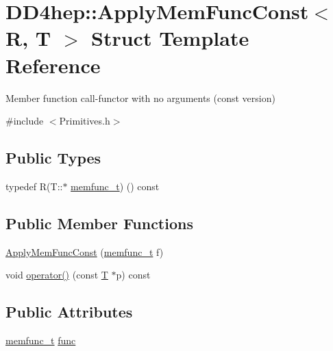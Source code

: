 \hypertarget{struct_d_d4hep_1_1_apply_mem_func_const}{}\section{D\+D4hep\+:\+:Apply\+Mem\+Func\+Const$<$ R, T $>$ Struct Template Reference}
\label{struct_d_d4hep_1_1_apply_mem_func_const}


Member function call-\/functor with no arguments (const version)  




{\ttfamily \#include $<$Primitives.\+h$>$}

\subsection*{Public Types}
\begin{DoxyCompactItemize}
\item 
typedef R(T\+::$\ast$ \hyperlink{struct_d_d4hep_1_1_apply_mem_func_const_a0baa998fbf89b0c25d9de76bbd9a95e7}{memfunc\+\_\+t}) () const
\end{DoxyCompactItemize}
\subsection*{Public Member Functions}
\begin{DoxyCompactItemize}
\item 
\hyperlink{struct_d_d4hep_1_1_apply_mem_func_const_a2ced0eb9c81ba9bb827054c2afc42961}{Apply\+Mem\+Func\+Const} (\hyperlink{struct_d_d4hep_1_1_apply_mem_func_const_a0baa998fbf89b0c25d9de76bbd9a95e7}{memfunc\+\_\+t} f)
\item 
void \hyperlink{struct_d_d4hep_1_1_apply_mem_func_const_a9c658da0085c5cc83f4899e0d5518cf5}{operator()} (const \hyperlink{class_t}{T} $\ast$p) const
\end{DoxyCompactItemize}
\subsection*{Public Attributes}
\begin{DoxyCompactItemize}
\item 
\hyperlink{struct_d_d4hep_1_1_apply_mem_func_const_a0baa998fbf89b0c25d9de76bbd9a95e7}{memfunc\+\_\+t} \hyperlink{struct_d_d4hep_1_1_apply_mem_func_const_a667382c86c9164ebeb9ff332d34d082a}{func}
\end{DoxyCompactItemize}


